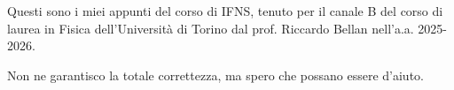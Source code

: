 Questi sono i miei appunti del corso di IFNS, tenuto per il canale B del corso di 
laurea in Fisica dell'Università di Torino dal prof. Riccardo Bellan nell'a.a.
2025-2026. 


Non ne garantisco la totale correttezza, ma spero che possano essere d'aiuto.
